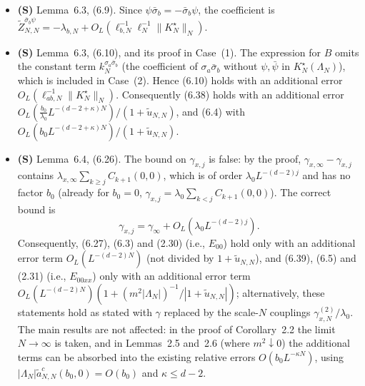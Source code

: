 \documentclass[11pt]{amsart}
\numberwithin{equation}{section}
\newcommand{\obs}{\star}
\newcommand{\Kobs}{K^\obs}
\newcommand{\ellabN}{\ell_{ab,N}}
\newcommand{\OL}{O_L}
\newcommand{\tu}{\tilde u_{N,N}}
\begin{document}
\begin{itemize}
\item \textbf{(S)} Lemma~6.3, (6.9). Since $\psi\bar\sigma_b=-\bar\sigma_b\psi$, the coefficient is
  $\tilde Z^{\bar\sigma_b\psi}_{N,N}=-\lambda_{b,N}+\OL(\ell_{b,N}^{-1}\ell_N^{-1}\|\Kobs_N\|_N)$.

\item \textbf{(S)} Lemma~6.3, (6.10), and its proof in Case~(1). The expression for $B$ omits the
  constant term $k_N^{\sigma_a\bar\sigma_b}$ (the coefficient of $\sigma_a\bar\sigma_b$ without
  $\psi,\bar\psi$ in $\Kobs_N(\Lambda_N)$), which is included in Case~(2). Hence (6.10) holds
  with an additional error $\OL(\ellabN^{-1}\|\Kobs_N\|_N)$. Consequently (6.38) holds with an
  additional error $\OL(\frac{b_0}{\lambda_0}L^{-(d-2+\kappa)N})/(1+\tu)$, and (6.4) with
  $\OL(b_0L^{-(d-2+\kappa)N})/(1+\tu)$.

\item \textbf{(S)} Lemma~6.4, (6.26). The bound on $\gamma_{x,j}$ is false: by the proof,
  $\gamma_{x,\infty}-\gamma_{x,j}$ contains $\lambda_{x,\infty}\sum_{k\ge j}C_{k+1}(0,0)$, which is of
  order $\lambda_0L^{-(d-2)j}$ and has no factor $b_0$ (already for $b_0=0$,
  $\gamma_{x,j}=\lambda_0\sum_{k<j}C_{k+1}(0,0)$). The correct bound is
  \begin{equation*}
    \gamma_{x,j}=\gamma_\infty+\OL(\lambda_0L^{-(d-2)j}).
  \end{equation*}
  Consequently, (6.27), (6.3) and (2.30) (i.e., $E_{00}$) hold only with an additional error term
  $\OL(L^{-(d-2)N})$ (not divided by $1+\tu$), and (6.39), (6.5) and (2.31) (i.e., $E_{00xx}$) only
  with an additional error term $\OL(L^{-(d-2)N})(1+(m^2|\Lambda_N|)^{-1}/|1+\tu|)$; alternatively,
  these statements hold as stated with $\gamma$ replaced by the scale-$N$ couplings
  $\gamma^{(2)}_{x,N}/\lambda_0$. The main results are not affected: in the proof of
  Corollary~2.2 the limit $N\to\infty$ is taken, and in Lemmas~2.5 and~2.6 (where $m^2\downarrow0$)
  the additional terms can be absorbed into the existing relative errors $O(b_0L^{-\kappa N})$,
  using $|\Lambda_N|\tilde a^c_{N,N}(b_0,0)=O(b_0)$ and $\kappa\le d-2$.


\end{itemize}
\end{document}
